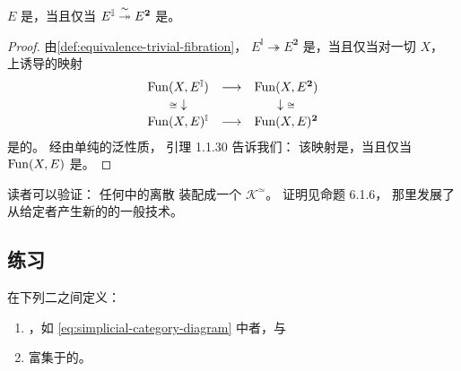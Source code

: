 \begin{lemma}\label{lem:discrete-trivial-fibration}
\trInfinityCategory{} $E$ 是\trDiscrete{}，当且仅当
$E^{\mathbb{I}}\mathrel{\stackrel{\sim}{\twoheadrightarrow}} E^{\mathbf{2}}$ 是\trTrivialFibration{}。
\end{lemma}
\begin{proof}
由\cref{def:equivalence-trivial-fibration}，
\trIsofibration $E^{\mathbb{I}}\twoheadrightarrow E^{\mathbf{2}}$
是\trTrivialFibration{}，当且仅当对一切\trInfinityCategory{} $X$，
\trFunctorSpace{}上诱导的映射 %
\begin{equation*}
\begin{array}{ccc}
\operatorname{Fun}(X,E^{\mathbb{I}}) & \longrightarrow & \operatorname{Fun}(X,E^{\mathbf{2}})\\[0.4ex]
{\scriptstyle\cong}\downarrow & & \downarrow{\scriptstyle\cong}\\[0.4ex]
\operatorname{Fun}(X,E)^{\mathbb{I}} & \longrightarrow & \operatorname{Fun}(X,E)^{\mathbf{2}}
\end{array}
\end{equation*}
是\trQuasiCategory{}的\trTrivialFibration{}。
经由单纯\trCotensor{}的泛性质，
引理 1.1.30 告诉我们：
该映射是\trTrivialFibration{}，当且仅当 $\operatorname{Fun}(X,E)$ 是\trKanComplex{}。
\end{proof}
读者可以验证：
任何\trInfinityCosmos{}中的离散\trInfinityCategory{}%
装配成一个\trInfinityCosmos{} $\mathcal{K}^{\simeq}$。
证明见命题 6.1.6，
那里发展了从给定者产生新的\trInfinityCosmos{}的一般技术。

\subsection*{练习}

\begin{exercise}\label{ex:simplicial-versus-enriched}
在下列二\trCategory{}之间定义\trEquivalence{}：
\begin{enumerate}[label=(\roman*)]
  \item \trSimplicialCategory{}，如 \eqref{eq:simplicial-category-diagram} 中者，与
\item 富集于\trSimplicialSet{}的\trCategory{}。
\end{enumerate}
\end{exercise}

